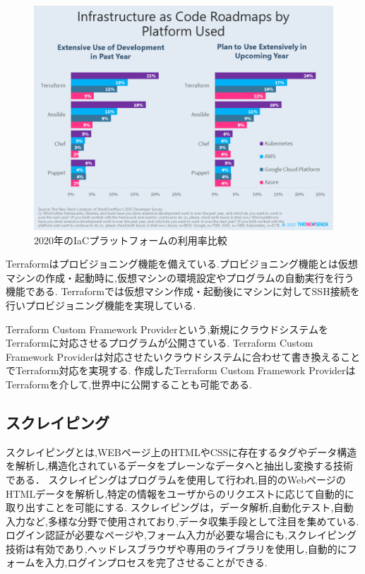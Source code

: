 \documentclass[11pt]{ujarticle}\sloppy
\begin{document}
\begin{figure}[h]
	\includegraphics[width=1\linewidth]{./images/terraform.png}
	\caption{2020年のIaCプラットフォームの利用率比較\cite{THENEWSTACK}}
	\label{fig:terraform}
\end{figure}

Terraformはプロビジョニング機能を備えている.プロビジョニング機能とは仮想マシンの作成・起動時に,仮想マシンの環境設定やプログラムの自動実行を行う機能である.
Terraformでは仮想マシン作成・起動後にマシンに対してSSH接続を行いプロビジョニング機能を実現している.

Terraform Custom Framework Providerという,新規にクラウドシステムをTerraformに対応させるプログラムが公開さている.
Terraform Custom Framework Providerは対応させたいクラウドシステムに合わせて書き換えることでTerraform対応を実現する.
作成したTerraform Custom Framework ProviderはTerraformを介して,世界中に公開することも可能である.


\subsection{スクレイピング}

スクレイピングとは,WEBページ上のHTMLやCSSに存在するタグやデータ構造を解析し,構造化されているデータをプレーンなデータへと抽出し変換する技術である．
スクレイピングはプログラムを使用して行われ,目的のWebページのHTMLデータを解析し,特定の情報をユーザからのリクエストに応じて自動的に取り出すことを可能にする.
スクレイピングは，データ解析,自動化テスト,自動入力など,多様な分野で使用されており,データ収集手段として注目を集めている.
ログイン認証が必要なページや,フォーム入力が必要な場合にも,スクレイピング技術は有効であり,ヘッドレスブラウザや専用のライブラリを使用し,自動的にフォームを入力,ログインプロセスを完了させることができる.
\end{document}
